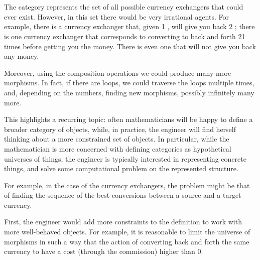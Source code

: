 \section{ }


The category \Curr represents the set of all possible currency exchangers that could ever exist. However, in this set there would be very irrational agents.
For example, there is a currency exchanger that, given 1 \usd, will give you back 2 \usd; there is one currency exchanger that corresponds to converting \usd  to \chf back and forth 21 times before getting you the money. There is even one that will not give you back any money.

Moreover, using the composition operations we could produce many more morphisms. In fact, if there are loops, we could traverse the loops multiple times, and, depending on the numbers, finding new morphisms, possibly infinitely many more.

This highlights a recurring topic: often mathematicians will be happy to define a broader category of objects, while, in practice, the engineer will find herself thinking about a more constrained set of objects.
In particular, while the mathematician is more concerned with defining categories as hypothetical universes of things, the engineer is typically interested in representing concrete things, and solve some computational problem on the represented structure.

For example, in the case of the currency exchangers, the problem might be that of finding the sequence of the best conversions between a source and a target currency.

First, the engineer would add more constraints to the definition to work with more well-behaved objects. For example, it is reasonable to limit the universe of morphisms in such a way that the action of converting back and forth the same currency to have a cost (through the commission) higher than 0.

